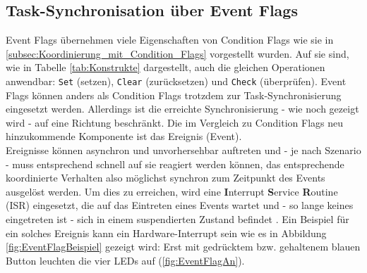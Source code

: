 \documentclass{llncs}
\begin{document}
\subsection{Task-Synchronisation über Event Flags}
\label{subsec:Task-Synchronisation_Event_Flags}
Event Flags übernehmen viele Eigenschaften von Condition Flags wie sie in \ref{subsec:Koordinierung_mit_Condition_Flags} vorgestellt wurden. Auf sie sind, wie in Tabelle \ref{tab:Konstrukte} dargestellt, auch die gleichen Operationen anwendbar: \texttt{Set} (setzen), \texttt{Clear} (zurücksetzen) und \texttt{Check} (überprüfen). Event Flags können anders als Condition Flags trotzdem zur Task-Synchronisierung eingesetzt werden. Allerdings ist die erreichte Synchronisierung - wie noch gezeigt wird - auf eine Richtung beschränkt. Die im Vergleich zu Condition Flags neu hinzukommende Komponente ist das Ereignis (Event).\\

Ereignisse können asynchron und unvorhersehbar auftreten und - je nach Szenario - muss entsprechend schnell auf sie reagiert werden können, das entsprechende koordinierte Verhalten also möglichst synchron zum Zeitpunkt des Events ausgelöst werden. Um dies zu erreichen, wird eine \textbf{I}nterrupt \textbf{S}ervice \textbf{R}outine (ISR) eingesetzt, die auf das Eintreten eines Events wartet und - so lange keines eingetreten ist - sich in einem suspendierten Zustand befindet \autocite[vgl.][87]{Cooling2017}. Ein Beispiel für ein solches Ereignis kann ein Hardware-Interrupt sein wie es in Abbildung \ref{fig:EventFlagBeispiel} gezeigt wird: Erst mit gedrücktem bzw. gehaltenem blauen Button leuchten die vier LEDs auf (\ref{fig:EventFlagAn}).\\
\end{document}
